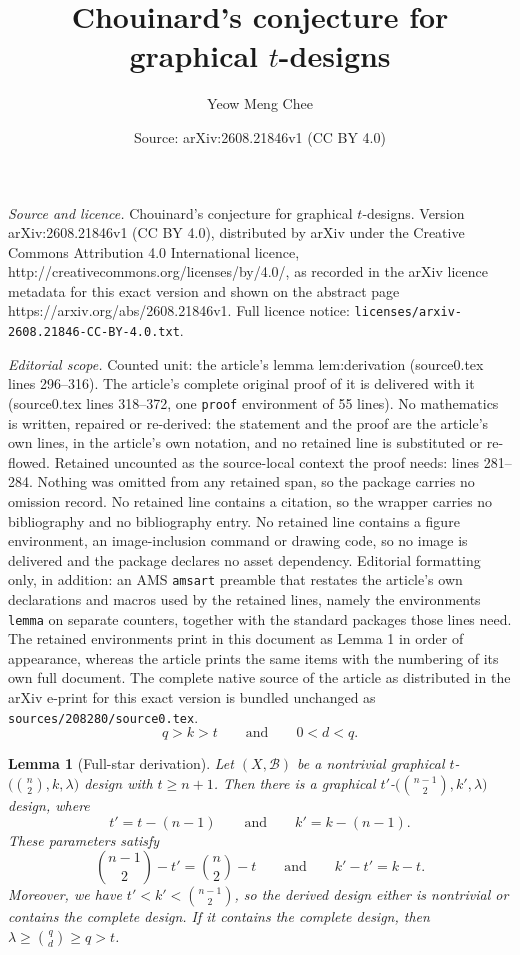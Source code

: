 \documentclass[10pt,a4paper]{amsart}
\title{Chouinard's conjecture for graphical $t$-designs}
\author{Yeow Meng Chee}
\date{Source: arXiv:2608.21846v1 (CC BY 4.0)}
\newtheorem{lemma}{Lemma}
\newcommand{\cB}{\mathcal{B}}
\begin{document}
\maketitle

\noindent\emph{Source and licence.} Chouinard's conjecture for graphical $t$-designs. Version arXiv:2608.21846v1 (CC BY 4.0), distributed by arXiv under the Creative Commons Attribution 4.0 International licence, http://creativecommons.org/licenses/by/4.0/, as recorded in the arXiv licence metadata for this exact version and shown on the abstract page https://arxiv.org/abs/2608.21846v1. Full licence notice: \texttt{licenses/arxiv-2608.21846-CC-BY-4.0.txt}.\par\smallskip

\noindent\textit{Editorial scope.} Counted unit: the article's lemma lem:derivation (source0.tex lines 296--316). The article's complete original proof of it is delivered with it (source0.tex lines 318--372, one \texttt{proof} environment of 55 lines). No mathematics is written, repaired or re-derived: the statement and the proof are the article's own lines, in the article's own notation, and no retained line is substituted or re-flowed.  Retained uncounted as the source-local context the proof needs: lines 281--284.  Nothing was omitted from any retained span, so the package carries no omission record.  No retained line contains a citation, so the wrapper carries no bibliography and no bibliography entry.  No retained line contains a figure environment, an image-inclusion command or drawing code, so no image is delivered and the package declares no asset dependency.  Editorial formatting only, in addition: an AMS \texttt{amsart} preamble that restates the article's own declarations and macros used by the retained lines, namely the environments \texttt{lemma} on separate counters, together with the standard packages those lines need.  The retained environments print in this document as Lemma 1 in order of appearance, whereas the article prints the same items with the numbering of its own full document.  The complete native source of the article as distributed in the arXiv e-print for this exact version is bundled unchanged as \texttt{sources/208280/source0.tex}.
\begin{equation}
\label{eq:qkt}
q > k > t \qquad \text{and} \qquad 0 < d < q.
\end{equation}

\begin{lemma}[Full-star derivation]
\label{lem:derivation}
Let $(X, \cB)$ be a nontrivial graphical $t$-$\bigl(\binom{n}{2}, k,
\lambda\bigr)$ design with $t \geq n + 1$. Then there is a graphical
$t'$-$\bigl(\binom{n-1}{2}, k', \lambda\bigr)$ design, where
\[
t' = t - (n - 1)
\qquad \text{and} \qquad
k' = k - (n - 1).
\]
These parameters satisfy
\begin{equation}
\label{eq:invariants}
\binom{n - 1}{2} - t' = \binom{n}{2} - t
\qquad \text{and} \qquad
k' - t' = k - t.
\end{equation}
Moreover, we have $t' < k' < \binom{n - 1}{2}$, so the derived design either
is nontrivial or contains the complete design. If it contains the complete
design, then $\lambda \geq \binom{q}{d} \geq q > t$.
\end{lemma}
\end{document}
